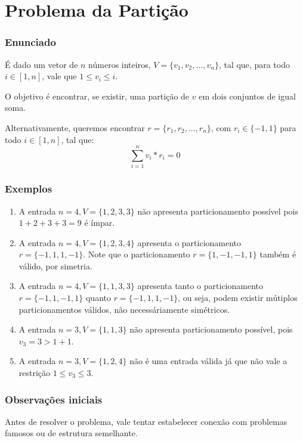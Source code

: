 \chapter{Problema da Partição}
\label{particao}

\subsection*{Enunciado}

É dado um vetor de $n$ números inteiros, $V = \{v_1, v_2, ..., v_n\}$, tal que, para todo $i \in [1, n]$, vale que $1 \leq v_i \leq i$.

O objetivo é encontrar, se existir, uma partição de $v$ em dois conjuntos de igual soma.

Alternativamente, queremos encontrar $r = \{r_1, r_2, ..., r_n\}$, com $r_i \in \{-1, 1\}$ para todo $i \in [1, n]$, tal que:
$$\sum_{i = 1}^n v_i*r_i = 0$$

\subsection*{Exemplos}

\begin{enumerate}
    \item A entrada $n = 4, V = \{1, 2, 3, 3\}$ não apresenta particionamento possível pois $1 + 2 + 3 + 3 = 9$ é ímpar.
    \item A entrada $n = 4, V = \{1, 2, 3, 4\}$ apresenta o particionamento $r = \{-1, 1, 1, -1\}$. Note que o particionamento $r = \{1, -1, -1, 1\}$ também é válido, por simetria.
    \item A entrada $n = 4, V = \{1, 1, 3, 3\}$ apresenta tanto o particionamento $r = \{-1, 1, -1, 1\}$ quanto $r = \{-1, 1, 1, -1\}$, ou seja, podem existir mútiplos particionamentos válidos, não necessáriamente simétricos.
    \item A entrada $n = 3, V = \{1, 1, 3\}$ não apresenta particionamento possível, pois $v_3 = 3 > 1 + 1$.
    \item A entrada $n = 3, V = \{1, 2, 4\}$ não é uma entrada válida já que não vale a restrição $1 \leq v_3 \leq 3$.
\end{enumerate}

\subsection*{Observações iniciais}

Antes de resolver o problema, vale tentar estabelecer conexão com problemas famosos ou de estrutura semelhante.

